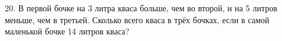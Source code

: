 20. В первой бочке на 3 литра кваса больше, чем во второй, и на 5 литров меньше, чем в третьей. Сколько всего кваса в трёх бочках, если в самой маленькой бочке 14 литров кваса?\\
